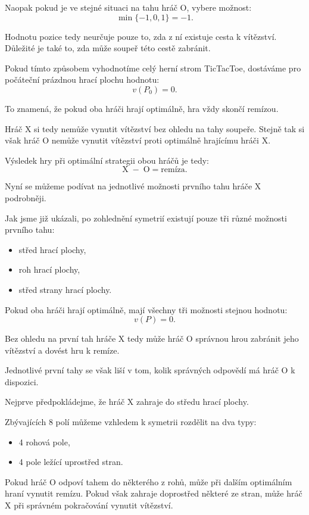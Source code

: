 \documentclass[12pt,a4paper]{article}
\begin{document}
Naopak pokud je ve stejné situaci na tahu hráč $\mathrm{O}$, vybere možnost:
\[
    \min\{-1,0,1\}=-1.
\]

Hodnotu pozice tedy neurčuje pouze to, zda z ní existuje cesta k vítězství.
Důležité je také to, zda může soupeř této cestě zabránit.

Pokud tímto způsobem vyhodnotíme celý herní strom TicTacToe, 
dostáváme pro počáteční prázdnou hrací plochu hodnotu:
\[
    v(P_0)=0.
\]

To znamená, že pokud oba hráči hrají optimálně, hra vždy skončí remízou.

Hráč $\mathrm{X}$ si tedy nemůže vynutit vítězství bez ohledu na tahy soupeře.
Stejně tak si však hráč $\mathrm{O}$ nemůže vynutit vítězství 
proti optimálně hrajícímu hráči $\mathrm{X}$.

Výsledek hry při optimální strategii obou hráčů je tedy:
\[
    \mathrm{X}\;-\;\mathrm{O}=\text{remíza}.
\]

Nyní se můžeme podívat na jednotlivé možnosti prvního tahu hráče $\mathrm{X}$ podrobněji.

Jak jsme již ukázali, po zohlednění symetrií existují pouze tři různé možnosti prvního tahu:
\begin{itemize}
    \item střed hrací plochy,
    \item roh hrací plochy,
    \item střed strany hrací plochy.
\end{itemize}

Pokud oba hráči hrají optimálně, mají všechny tři možnosti stejnou hodnotu:
\[
    v(P)=0.
\]

Bez ohledu na první tah hráče $\mathrm{X}$ tedy může hráč 
$\mathrm{O}$ správnou hrou zabránit jeho vítězství a dovést hru k remíze.

Jednotlivé první tahy se však liší v tom, 
kolik správných odpovědí má hráč $\mathrm{O}$ k dispozici.

Nejprve předpokládejme, že hráč $\mathrm{X}$ zahraje do středu hrací plochy.

Zbývajících 8 polí můžeme vzhledem k symetrii rozdělit na dva typy:
\begin{itemize}
    \item 4 rohová pole,
    \item 4 pole ležící uprostřed stran.
\end{itemize}

Pokud hráč $\mathrm{O}$ odpoví tahem do některého z rohů, 
může při dalším optimálním hraní vynutit remízu. 
Pokud však zahraje doprostřed některé ze stran, 
může hráč $\mathrm{X}$ při správném pokračování vynutit vítězství.
\end{document}
